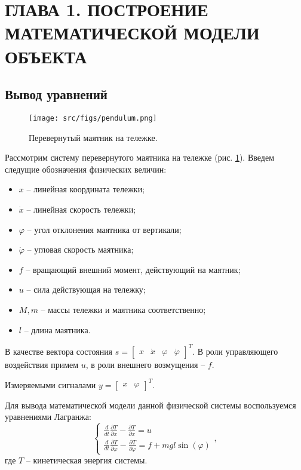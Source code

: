 \section{ГЛАВА 1. ПОСТРОЕНИЕ МАТЕМАТИЧЕСКОЙ МОДЕЛИ ОБЪЕКТА}

\subsection{Вывод уравнений}

\begin{figure}[h]
  \centering
  \texttt{[image: src/figs/pendulum.png]}
  \caption{\label{fig:task1_1}Перевернутый маятник на тележке.}
\end{figure}

Рассмотрим систему перевернутого маятника на тележке (рис. \ref{fig:task1_1}). Введем следущие обозначения физических величин:
\begin{itemize}
  \item $x$ -- линейная координата тележки;
  \item $\dot{x}$ -- линейная скорость тележки;
  \item $\varphi$ -- угол отклонения маятника от вертикали;
  \item $\dot{\varphi}$ -- угловая скорость маятника;
  \item $f$ -- вращающий внешний момент, действующий на маятник;
  \item $u$ -- сила действующая на тележку;
  \item $M, m$ --  массы тележки и маятника соответственно;
  \item $l$ -- длина маятника.
\end{itemize}

В качестве вектора состояния \(s = \begin{bmatrix} x & \dot{x} & \varphi & \dot{\varphi}\end{bmatrix}^T\). 
В роли управляющего воздействия примем $u$, в роли внешнего возмущения -- $f$.

Измеряемыми сигналами \(y = \begin{bmatrix} x & \varphi \end{bmatrix}^T\).

Для вывода математической модели данной физической системы воспользуемся уравнениями Лагранжа:
\begin{equation} \label{eq:2}
  \begin{cases}
      \frac{d}{dt}\frac{\partial T}{\partial \dot{x}} - \frac{\partial T}{\partial x} = u \\
      \frac{d}{dt}\frac{\partial T}{\partial \dot{\varphi}} - \frac{\partial T}{\partial \varphi} = f + mgl\sin(\varphi)
  \end{cases},
\end{equation}
где $T$ -- кинетическая энергия системы.

